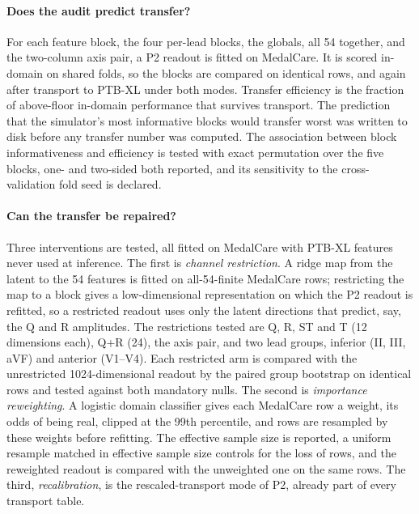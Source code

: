 \paragraph{Does the audit predict transfer?}
For each feature block, the four per-lead blocks, the globals, all 54 together, and the two-column axis pair, a P2 readout is fitted on MedalCare. It is scored in-domain on shared folds, so the blocks are compared on identical rows, and again after transport to PTB-XL under both modes. Transfer efficiency is the fraction of above-floor in-domain performance that survives transport. The prediction that the simulator's most informative blocks would transfer worst was written to disk before any transfer number was computed. The association between block informativeness and efficiency is tested with exact permutation over the five blocks, one- and two-sided both reported, and its sensitivity to the cross-validation fold seed is declared.  

\paragraph{Can the transfer be repaired?}
Three interventions are tested, all fitted on MedalCare with PTB-XL features never used at inference. The first is \emph{channel restriction}. A ridge map from the latent to the 54 features is fitted on all-54-finite MedalCare rows; restricting the map to a block gives a low-dimensional representation on which the P2 readout is refitted, so a restricted readout uses only the latent directions that predict, say, the Q and R amplitudes. The restrictions tested are Q, R, ST and T (12 dimensions each), Q+R (24), the axis pair, and two lead groups, inferior (II, III, aVF) and anterior (V1--V4). Each restricted arm is compared with the unrestricted 1024-dimensional readout by the paired group bootstrap on identical rows and tested against both mandatory nulls. The second is \emph{importance reweighting}. A logistic domain classifier gives each MedalCare row a weight, its odds of being real, clipped at the 99th percentile, and rows are resampled by these weights before refitting. The effective sample size is reported, a uniform resample matched in effective sample size controls for the loss of rows, and the reweighted readout is compared with the unweighted one on the same rows. The third, \emph{recalibration}, is the rescaled-transport mode of P2, already part of every transport table. 

